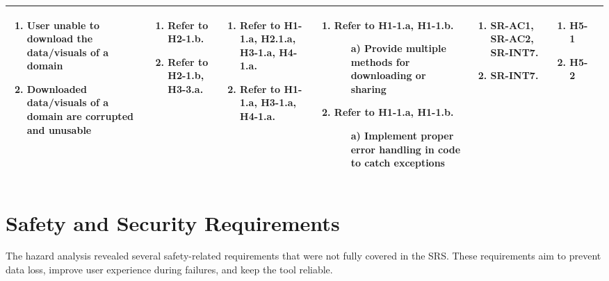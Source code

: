 \documentclass{article}
\begin{document}
\begin{landscape}
\begin{longtable}{|p{2cm}|p{4cm}|p{4cm}|p{4cm}|p{4cm}|p{2cm}|p{2cm}|}
  \begin{enumerate}[leftmargin=*]
    \item User unable to download the data/visuals of a domain
    \item Downloaded data/visuals of a domain are corrupted and unusable
  \end{enumerate} &
  \begin{enumerate}[leftmargin=*]
      \item Refer to H2-1.b.
      \item Refer to H2-1.b, H3-3.a.
  \end{enumerate} &
  \begin{enumerate}[leftmargin=*]
    \item Refer to H1-1.a, H2.1.a, H3-1.a, H4-1.a.
    \item Refer to H1-1.a, H3-1.a, H4-1.a.
  \end{enumerate} &
  \begin{enumerate}[leftmargin=*]
       \item Refer to H1-1.a, H1-1.b.
       \begin{enumerate}
        \item[a)] Provide multiple methods for downloading or sharing
    \end{enumerate}
       \item Refer to H1-1.a, H1-1.b.
       \begin{enumerate}
        \item[a)] Implement proper error handling in code to catch exceptions
    \end{enumerate}
  \end{enumerate} &
  \begin{enumerate}[leftmargin=*]
       \item SR-AC1, SR-AC2, SR-INT7.
       \item SR-INT7.
  \end{enumerate} &
  \begin{enumerate}[leftmargin=*]
       \item H5-1
       \item H5-2
  \end{enumerate} \\
  \hline
  \end{longtable}
\end{landscape}
\restoregeometry


\section{Safety and Security Requirements}
The hazard analysis revealed several safety-related requirements that were not fully covered in the SRS.
These requirements aim to prevent data loss, improve user experience during failures, and keep the tool reliable.
\end{document}
